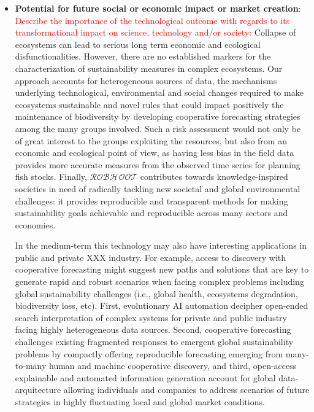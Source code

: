\documentclass[11pt, a4paper]{article} %
\begin{document}
{\begin{itemize}
\item {\bf Potential for future social or economic impact or market creation}:\\
  \textcolor{red}{Describe the importance of the technological outcome
    with regards to its transformational impact on science, technology
    and/or society:} Collapse of ecosystems can lead to serious long
  term economic and ecological disfunctionalities. However, there are
  no established markers for the characterization of sustainability
  measures in complex ecosystems. Our approach accounts for
  heterogeneous sources of data, the mechanisms underlying
  technological, environmental and social changes required to make
  ecosystems sustainable and novel rules that could impact positively
  the maintenance of biodiversity by developing cooperative
  forecasting strategies among the many groups involved. Such a risk
  assessment would not only be of great interest to the groups
  exploiting the resources, but also from an economic and ecological
  point of view, as having less bias in the field data provides more
  accurate measures from the observed time series for planning fish
  stocks. Finally, $\mathcal{ROBHOOT}$ contributes towards
  knowledge-inspired societies in need of radically tackling new
  societal and global environmental challenges: it provides
  reproducible and transparent methods for making sustainability goals
  achievable and reproducible across many sectors and economies.

  In the medium-term this technology may also have interesting
  applications in public and private XXX industry. For example, access
  to discovery with cooperative forecasting might suggest new paths
  and solutions that are key to generate rapid and robust scenarios
  when facing complex problems including global sustainability
  challenges (i.e., global health, ecosystems degradation,
  biodiversity loss, etc). First, evolutionary AI automation decipher
  open-ended search interpretation of complex systems for private and
  public industry facing highly heterogeneous data sources. Second,
  cooperative forecasting challenges existing fragmented responses to
  emergent global sustainability problems by compactly offering
  reproducible forecasting emerging from many-to-many human and
  machine cooperative discovery, and third, open-access explainable
  and automated information generation account for global
  data-arquitecture allowing individuals and companies to address
  scenarios of future strategies in highly fluctuating local and
  global market conditions.


\end{itemize}}
\end{document}
